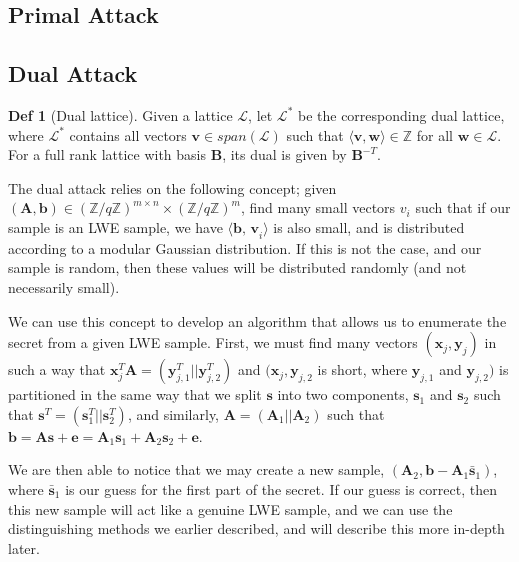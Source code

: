 \documentclass[a4paper, 10pt]{article}
\theoremstyle{definition}
\newtheorem{definition}{Def}[section]
\begin{document}
\subsection{Primal Attack}

\subsection{Dual Attack}

\begin{definition}[Dual lattice]
    Given a lattice $\mathcal{L}$, let $\mathcal{L} ^*$ be the corresponding dual lattice, where $\mathcal{L} ^*$ contains all vectors $\mathbf{v} \in span(\mathcal{L})$ such that $\langle \mathbf{v}, \mathbf{w} \rangle \in \mathbb{Z}$ for all $\mathbf{w} \in \mathcal{L}$. For a full rank lattice with basis $\mathbf{B}$, its dual is given by $\mathbf{B}^{-T}$.
\end{definition}

The dual attack relies on the following concept; given $(\mathbf{A, b}) \in (\mathbb{Z}/q\mathbb{Z})^{m \times n} \times (\mathbb{Z}/q\mathbb{Z})^m$, find many small vectors $v_i$ such that if our sample is an \ac{LWE} sample, we have $\langle \textbf{b, v}_i \rangle$ is also small, and is distributed according to a modular Gaussian distribution. If this is not the case, and our sample is random, then these values will be distributed randomly (and not necessarily small).

We can use this concept to develop an algorithm that allows us to enumerate the secret from a given \ac{LWE} sample. First, we must find many vectors $(\mathbf{x}_j, \mathbf{y}_j)$ in such a way that $\mathbf{x}_j^T\mathbf{A}=(\mathbf{y}^T_{j,1}||\mathbf{y}^T_{j,2})$ and $(\mathbf{x}_j, \mathbf{y}_{j,2}$ is short, where $\mathbf{y}_{j,1}$ and $\mathbf{y}_{j,2})$ is partitioned in the same way that we split $\mathbf{s}$ into two components, $\mathbf{s}_1$ and $\mathbf{s}_2$ such that $\mathbf{s}^T = (\mathbf{s}_1^T||\mathbf{s}_2^T)$, and similarly, $\mathbf{A}=(\mathbf{A}_1||\mathbf{A}_2)$ such that $\mathbf{b}=\mathbf{As+e}=\mathbf{A}_1 \mathbf{s}_1 + \mathbf{A}_2 \mathbf{s}_2 + \mathbf{e}$.

We are then able to notice that we may create a new sample, $(\mathbf{A}_2, \mathbf{b - A}_1 \bar{\mathbf{s}}_1)$, where $\bar{\mathbf{s}}_1$ is our guess for the first part of the secret. If our guess is correct, then this new sample will act like a genuine \ac{LWE} sample, and we can use the distinguishing methods we earlier described, and will describe this more in-depth later.
\end{document}
